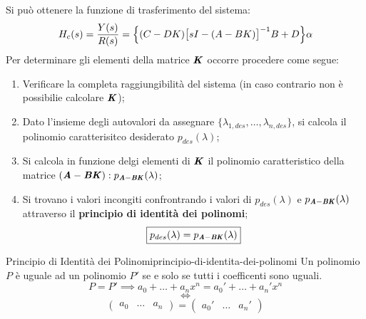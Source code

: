 \documentclass[12pt]{article}
\begin{document}
Si pu\`o ottenere la funzione di trasferimento del sistema:
\[ H_{c}(s) = \frac{Y(s)}{R(s)} =  \Bigl\{ (C-DK) \bigl[sI - (A-BK)\bigr]^{-1} B + D \Bigr\} \alpha \]
Per determinare gli elementi della matrice $\textbf{\textit{K}}$ occorre procedere come segue:
\begin{enumerate}
    \item Verificare la completa raggiungibilit\`a del sistema (in caso contrario non \`e possibilie calcolare $\textbf{\textit{K}}$);
    \item Dato l'insieme degli autovalori da assegnare $\{ \lambda _{1,des}, \dots , \lambda _{n,des}\}$, si calcola il polinomio caratterisitco desiderato $p _{des}(\lambda)$;
    \item Si calcola in funzione delgi elementi di $\textbf{\textit{K}}$ il polinomio caratteristico della matrice $(\textbf{\textit{A}}-\textbf{\textit{BK}}) : p _{\textbf{\textit{A}}-\textbf{\textit{BK}}}(\lambda)$;
    \item Si trovano i valori incongiti confrontrando i valori di $p _{des}(\lambda)$ e $p _{\textbf{\textit{A}}-\textbf{\textit{BK}}}(\lambda)$ attraverso il \textbf{principio di identit\`a dei polinomi};
        \[ \boxed{p _{des}(\lambda) = p _{\textbf{\textit{A}}-\textbf{\textit{BK}}}(\lambda)} \]
\end{enumerate}

\begin{theorem}{Principio di Identit\`a dei Polinomi}{principio-di-identita-dei-polinomi}
    Un polinomio $P$ \`e uguale ad un polinomio $P'$ se e solo se tutti i coefficenti sono uguali.
    \[ P = P' \implies a_0 + \dots + a_nx^{n} = a_0' + \dots + a_n'x^{n} \]
    \[ \iff \]
    \[ \begin{pmatrix} a_0 & \dots & a_n \end{pmatrix} = \begin{pmatrix} a_0' & \dots & a_n' \end{pmatrix}  \]
\end{theorem}
\end{document}
